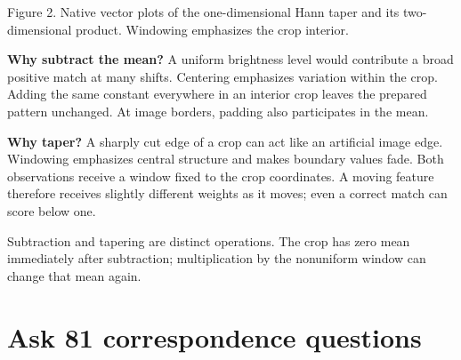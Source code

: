 \documentclass[11pt,letterpaper]{article}
\begin{document}
\begin{center}\end{center}

{
\small\color{muted} Figure 2. Native vector plots of the one-dimensional Hann taper and its two-dimensional product. Windowing emphasizes the crop interior.\par}


\textbf{Why subtract the mean?} A uniform brightness level would contribute a broad positive match at many shifts. Centering emphasizes variation within the crop. Adding the same constant everywhere in an interior crop leaves the prepared pattern unchanged. At image borders, padding also participates in the mean.


\textbf{Why taper?} A sharply cut edge of a crop can act like an artificial image edge. Windowing emphasizes central structure and makes boundary values fade. Both observations receive a window fixed to the crop coordinates. A moving feature therefore receives slightly different weights as it moves; even a correct match can score below one.


{
\small\color{muted} Subtraction and tapering are distinct operations. The crop has zero mean immediately after subtraction; multiplication by the nonuniform window can change that mean again.\par}


\clearpage

\section{Ask 81 correspondence questions}\label{sec4}
\end{document}
